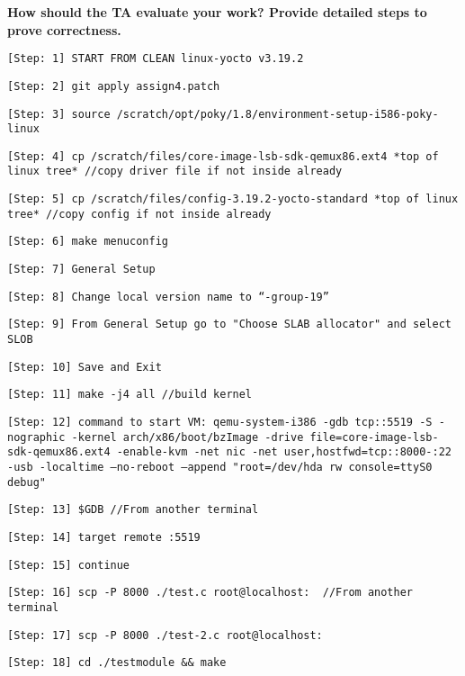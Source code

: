 \documentclass[10pt,letterpaper,draftclsnofoot,onecolumn]{IEEEtran}
\begin{document}
\noindent\textbf{How should the TA evaluate your work? Provide detailed steps to prove correctness.}
\begin{description}
\item \texttt{[Step: 1] START FROM CLEAN linux-yocto v3.19.2}
\item \texttt{[Step: 2] git apply assign4.patch}
\item \texttt{[Step: 3] source /scratch/opt/poky/1.8/environment-setup-i586-poky-linux}
\item \texttt{[Step: 4] cp /scratch/files/core-image-lsb-sdk-qemux86.ext4 *top of linux tree* \newline //copy driver file if not inside already}
\item \texttt{[Step: 5] cp /scratch/files/config-3.19.2-yocto-standard *top of linux tree* \newline//copy config if not inside already}
\item \texttt{[Step: 6] make menuconfig}
\item \texttt{[Step: 7] General Setup}
\item \texttt{[Step: 8] Change local version name to “-group-19”}
\item \texttt{[Step: 9] From General Setup go to "Choose SLAB allocator" and select SLOB}
\item \texttt{[Step: 10] Save and Exit}
\item \texttt{[Step: 11] make -j4 all \newline //build kernel}
\item \texttt{[Step: 12] command to start VM: \newline qemu-system-i386 -gdb tcp::5519 -S -nographic -kernel arch/x86/boot/bzImage -drive file=core-image-lsb-sdk-qemux86.ext4 -enable-kvm -net nic -net user,hostfwd=tcp::8000-:22 -usb -localtime --no-reboot --append "root=/dev/hda rw console=ttyS0 debug"}
\item \texttt{[Step: 13] \$GDB \newline //From another terminal}
\item \texttt{[Step: 14] target remote :5519}
\item \texttt{[Step: 15] continue}
\item \texttt{[Step: 16] scp -P 8000 ./test.c root@localhost:~ \newline //From another terminal}
\item \texttt{[Step: 17] scp -P 8000 ./test-2.c root@localhost:~}
\item \texttt{[Step: 18] cd ./testmodule \&\& make}

\end{description}
\end{document}
